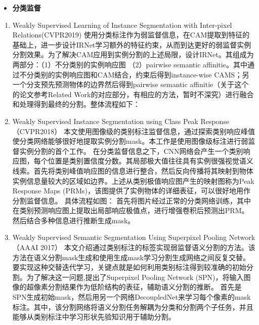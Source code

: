 \begin{itemize}
\item
  \textbf{分类监督}
\end{itemize}

\begin{enumerate}
\def\labelenumi{\arabic{enumi}.}
\item
  Weakly Supervised Learning of Instance Segmentation with Inter-pixel
  Relations(CVPR2019)
  使用分类标注作为弱监督信息，在CAM提取到特征的基础上，进一步设计IRNet学习额外的特征约束，从而到达更好的弱监督实例分割效果。为了解决CAM应用到实例分割的上述局限，设计IRNet。其组成为两部分：（1）不分类别的实例响应图
  （2）pairwise semantic
  affinitie。其中通过不分类别的实例响应图和CAM结合，约束后得到instance-wise
  CAMS；另一个分支预先预测物体的边界然后得到pairwise semantic
  affinitie（关于这个的论文参考Related
  Work的对应部分，有相应的方法，暂时不深究）进行融合和处理得到最终的分割。整体流程如下：
\item
  Weakly Supervised Instance Segmentation using Class Peak
  Response（CVPR2018）
  本文使用图像级的类别标注监督信息，通过探索类别响应峰值使分类网络能够很好地提取实例分割mask。本工作是使用图像级标注进行弱监督实例分割的首个工作。
  在分类监督信息之下，CNN网络会产生一个类别响应图，每个位置是类别置信度分数。其局部极大值往往具有实例很强视觉语义线索。首先将类别峰值响应图的信息进行整合，然后反向传播将其映射到物体实例信息量较大的区域如边界。上述从类别极值响应图产生的映射图称为Peak
  Response Maps
  (PRMs)，该图提供了实例物体的详细表征，可以很好地用作分割监督信息。
  具体流程如图： %
  首先将图片经过正常的分类网络训练，其中在类别预测响应图上提取出局部响应极值点，进行增强卷积后预测出PRM。然后结合多种信息进行推断生成mask。
\item
  Weakly Supervised Semantic Segmentation Using Superpixel Pooling
  Network（AAAI 2017）
  本文介绍通过类别标注的标签实现弱监督语义分割的方法。该方法在语义分割mask生成和使用生成mask学习分割生成网络之间反复交替。要实现这种交替迭代学习，关键点就是如何利用类别标注得到较准确的初始分割。为了解决这一问题,提出了Superpixel
  Pooling Network
  (SPN)，将输入图像的超像素分割结果作为低阶结构的表征，辅助语义分割的推断。
  首先是SPN生成初始mask，然后用另一个网络DecoupledNet来学习每个像素的mask标注。其中，该分割网络将语义分割任务解耦为分类和分割两个子任务，并且能够从类别标注中学习形状先验知识用于辅助分割。
\end{enumerate}

